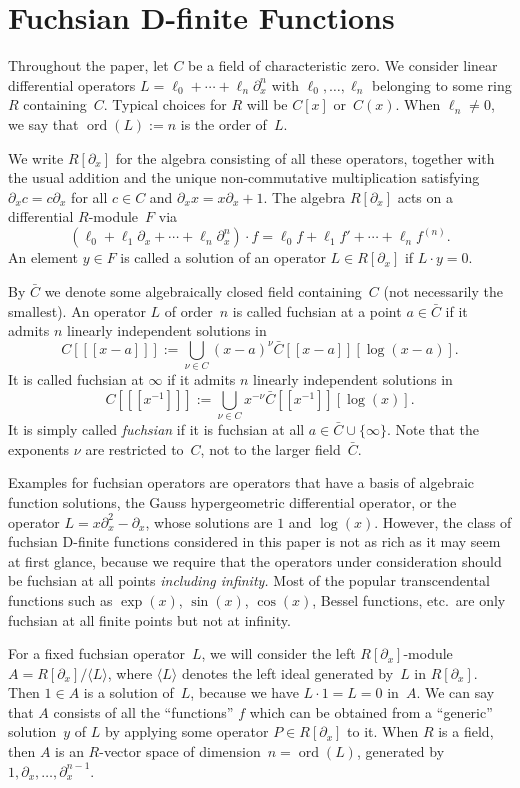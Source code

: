 \documentclass{sig-alternate}
\def\ord{\operatorname{ord}}
\def\<#1>{\langle#1\rangle}
\begin{document}
\section{Fuchsian D-finite Functions}

Throughout the paper, let $C$ be a field of characteristic zero. We consider linear differential operators
$L=\ell_0+\cdots+\ell_n\partial_x^n$ with $\ell_0,\dots,\ell_n$ belonging to some ring
$R$ containing~$C$. Typical choices for $R$ will be $C[x]$ or~$C(x)$.
When $\ell_n\neq0$, we say that $\ord(L):=n$ is the order of~$L$.

We write $R[\partial_x]$ for the algebra consisting of all these operators, together
with the usual addition and the unique non-commutative multiplication satisfying
$\partial_xc=c\partial_x$ for all $c\in C$ and $\partial_xx=x\partial_x+1$.
The algebra $R[\partial_x]$ acts on a differential $R$-module~$F$ via
\[
  (\ell_0+\ell_1\partial_x+\cdots+\ell_n\partial_x^n)\cdot f=
   \ell_0f + \ell_1f' + \cdots + \ell_n f^{(n)}.
\]
An element $y\in F$ is called a solution of an operator $L\in R[\partial_x]$ if
$L\cdot y=0$.

By $\bar C$ we denote some algebraically closed field containing~$C$ (not necessarily the smallest).
An operator $L$ of order~$n$ is called fuchsian at a point $a\in\bar C$ if
it admits $n$ linearly independent solutions in
\[
  C[[[x-a]]] := \bigcup_{\nu\in C} (x-a)^\nu\bar C[[x-a]][\log(x-a)].
\]
It is called fuchsian at $\infty$ if it admits $n$ linearly independent solutions in
\[
  C[[[x^{-1}]]] := \bigcup_{\nu\in C} x^{-\nu} \bar C[[x^{-1}]][\log(x)].
\]
It is simply called \emph{fuchsian} if it is fuchsian at all $a\in\bar C\cup\{\infty\}$.
Note that the exponents $\nu$ are restricted to~$C$, not to the larger field~$\bar C$.

Examples for fuchsian operators are operators that have a basis of algebraic
function solutions, the Gauss hypergeometric differential operator, or the
operator $L=x\partial_x^2-\partial_x$, whose solutions are $1$ and $\log(x)$.
However, the class of fuchsian D-finite functions
considered in this paper is not as rich as it may seem at first glance, because
we require that the operators under consideration should be fuchsian at all
points \emph{including infinity.} Most of the popular transcendental functions
such as $\exp(x)$, $\sin(x)$, $\cos(x)$, Bessel functions, etc.\ are only
fuchsian at all finite points but not at infinity.

For a fixed fuchsian operator~$L$, we will consider the left $R[\partial_x]$-module
$A=R[\partial_x]/\<L>$, where $\<L>$ denotes the left ideal generated by~$L$ in
$R[\partial_x]$.  Then $1\in A$ is a solution of~$L$, because we have $L\cdot 1=L=0$
in~$A$. We can say that $A$ consists of all the ``functions'' $f$ which can be
obtained from a ``generic'' solution~$y$ of $L$ by applying some operator $P\in
R[\partial_x]$ to it. When $R$ is a field, then $A$ is an $R$-vector space of
dimension~$n=\ord(L)$, generated by $1,\partial_x,\dots,\partial_x^{n-1}$.
\end{document}
